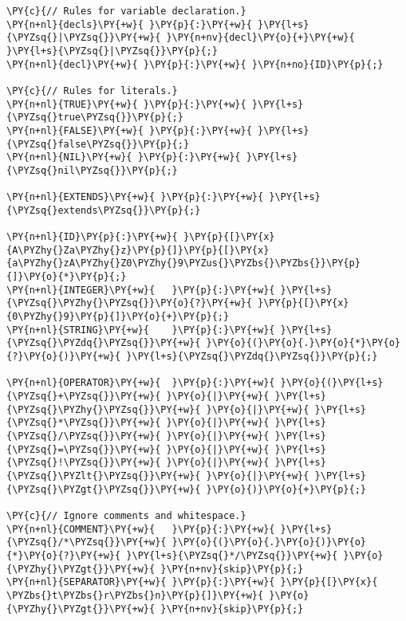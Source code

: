 \begin{Verbatim}[commandchars=\\\{\}]
\PY{c}{// Rules for variable declaration.}
\PY{n+nl}{decls}\PY{+w}{ }\PY{p}{:}\PY{+w}{ }\PY{l+s}{\PYZsq{}|\PYZsq{}}\PY{+w}{ }\PY{n+nv}{decl}\PY{o}{+}\PY{+w}{ }\PY{l+s}{\PYZsq{}|\PYZsq{}}\PY{p}{;}
\PY{n+nl}{decl}\PY{+w}{ }\PY{p}{:}\PY{+w}{ }\PY{n+no}{ID}\PY{p}{;}

\PY{c}{// Rules for literals.}
\PY{n+nl}{TRUE}\PY{+w}{ }\PY{p}{:}\PY{+w}{ }\PY{l+s}{\PYZsq{}true\PYZsq{}}\PY{p}{;}
\PY{n+nl}{FALSE}\PY{+w}{ }\PY{p}{:}\PY{+w}{ }\PY{l+s}{\PYZsq{}false\PYZsq{}}\PY{p}{;}
\PY{n+nl}{NIL}\PY{+w}{ }\PY{p}{:}\PY{+w}{ }\PY{l+s}{\PYZsq{}nil\PYZsq{}}\PY{p}{;}

\PY{n+nl}{EXTENDS}\PY{+w}{ }\PY{p}{:}\PY{+w}{ }\PY{l+s}{\PYZsq{}extends\PYZsq{}}\PY{p}{;}

\PY{n+nl}{ID}\PY{p}{:}\PY{+w}{ }\PY{p}{[}\PY{x}{A\PYZhy{}Za\PYZhy{}z}\PY{p}{]}\PY{p}{[}\PY{x}{a\PYZhy{}zA\PYZhy{}Z0\PYZhy{}9\PYZus{}\PYZbs{}\PYZbs{}}\PY{p}{]}\PY{o}{*}\PY{p}{;}
\PY{n+nl}{INTEGER}\PY{+w}{   }\PY{p}{:}\PY{+w}{ }\PY{l+s}{\PYZsq{}\PYZhy{}\PYZsq{}}\PY{o}{?}\PY{+w}{ }\PY{p}{[}\PY{x}{0\PYZhy{}9}\PY{p}{]}\PY{o}{+}\PY{p}{;}
\PY{n+nl}{STRING}\PY{+w}{    }\PY{p}{:}\PY{+w}{ }\PY{l+s}{\PYZsq{}\PYZdq{}\PYZsq{}}\PY{+w}{ }\PY{o}{(}\PY{o}{.}\PY{o}{*}\PY{o}{?}\PY{o}{)}\PY{+w}{ }\PY{l+s}{\PYZsq{}\PYZdq{}\PYZsq{}}\PY{p}{;}

\PY{n+nl}{OPERATOR}\PY{+w}{  }\PY{p}{:}\PY{+w}{ }\PY{o}{(}\PY{l+s}{\PYZsq{}+\PYZsq{}}\PY{+w}{ }\PY{o}{|}\PY{+w}{ }\PY{l+s}{\PYZsq{}\PYZhy{}\PYZsq{}}\PY{+w}{ }\PY{o}{|}\PY{+w}{ }\PY{l+s}{\PYZsq{}*\PYZsq{}}\PY{+w}{ }\PY{o}{|}\PY{+w}{ }\PY{l+s}{\PYZsq{}/\PYZsq{}}\PY{+w}{ }\PY{o}{|}\PY{+w}{ }\PY{l+s}{\PYZsq{}=\PYZsq{}}\PY{+w}{ }\PY{o}{|}\PY{+w}{ }\PY{l+s}{\PYZsq{}!\PYZsq{}}\PY{+w}{ }\PY{o}{|}\PY{+w}{ }\PY{l+s}{\PYZsq{}\PYZlt{}\PYZsq{}}\PY{+w}{ }\PY{o}{|}\PY{+w}{ }\PY{l+s}{\PYZsq{}\PYZgt{}\PYZsq{}}\PY{+w}{ }\PY{o}{)}\PY{o}{+}\PY{p}{;}

\PY{c}{// Ignore comments and whitespace.}
\PY{n+nl}{COMMENT}\PY{+w}{   }\PY{p}{:}\PY{+w}{ }\PY{l+s}{\PYZsq{}/*\PYZsq{}}\PY{+w}{ }\PY{o}{(}\PY{o}{.}\PY{o}{)}\PY{o}{*}\PY{o}{?}\PY{+w}{ }\PY{l+s}{\PYZsq{}*/\PYZsq{}}\PY{+w}{ }\PY{o}{\PYZhy{}\PYZgt{}}\PY{+w}{ }\PY{n+nv}{skip}\PY{p}{;}
\PY{n+nl}{SEPARATOR}\PY{+w}{ }\PY{p}{:}\PY{+w}{ }\PY{p}{[}\PY{x}{ \PYZbs{}t\PYZbs{}r\PYZbs{}n}\PY{p}{]}\PY{+w}{ }\PY{o}{\PYZhy{}\PYZgt{}}\PY{+w}{ }\PY{n+nv}{skip}\PY{p}{;}
\end{Verbatim}
